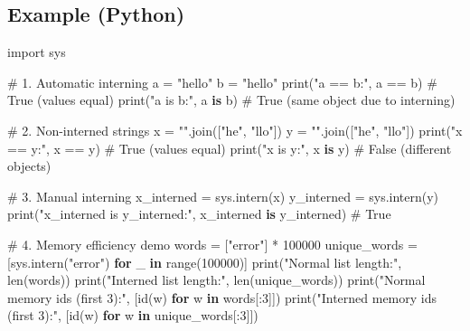 \documentclass[
  letterpaper,
  DIV=11,
  numbers=noendperiod]{scrreprt}
\newenvironment{Shaded}{\begin{snugshade}}{\end{snugshade}}
\newcommand{\BuiltInTok}[1]{\textcolor[rgb]{0.00,0.23,0.31}{#1}}
\newcommand{\CommentTok}[1]{\textcolor[rgb]{0.37,0.37,0.37}{#1}}
\newcommand{\ControlFlowTok}[1]{\textcolor[rgb]{0.00,0.23,0.31}{\textbf{#1}}}
\newcommand{\DecValTok}[1]{\textcolor[rgb]{0.68,0.00,0.00}{#1}}
\newcommand{\ImportTok}[1]{\textcolor[rgb]{0.00,0.46,0.62}{#1}}
\newcommand{\KeywordTok}[1]{\textcolor[rgb]{0.00,0.23,0.31}{\textbf{#1}}}
\newcommand{\NormalTok}[1]{\textcolor[rgb]{0.00,0.23,0.31}{#1}}
\newcommand{\OperatorTok}[1]{\textcolor[rgb]{0.37,0.37,0.37}{#1}}
\newcommand{\StringTok}[1]{\textcolor[rgb]{0.13,0.47,0.30}{#1}}
\begin{document}
\subsection{Example (Python)}\label{example-python-1}

\begin{Shaded}
\begin{Highlighting}[]
\ImportTok{import}\NormalTok{ sys}

\CommentTok{\# 1. Automatic interning}
\NormalTok{a }\OperatorTok{=} \StringTok{"hello"}
\NormalTok{b }\OperatorTok{=} \StringTok{"hello"}
\BuiltInTok{print}\NormalTok{(}\StringTok{"a == b:"}\NormalTok{, a }\OperatorTok{==}\NormalTok{ b)   }\CommentTok{\# True (values equal)}
\BuiltInTok{print}\NormalTok{(}\StringTok{"a is b:"}\NormalTok{, a }\KeywordTok{is}\NormalTok{ b)   }\CommentTok{\# True (same object due to interning)}

\CommentTok{\# 2. Non{-}interned strings}
\NormalTok{x }\OperatorTok{=} \StringTok{""}\NormalTok{.join([}\StringTok{"he"}\NormalTok{, }\StringTok{"llo"}\NormalTok{])}
\NormalTok{y }\OperatorTok{=} \StringTok{""}\NormalTok{.join([}\StringTok{"he"}\NormalTok{, }\StringTok{"llo"}\NormalTok{])}
\BuiltInTok{print}\NormalTok{(}\StringTok{"x == y:"}\NormalTok{, x }\OperatorTok{==}\NormalTok{ y)   }\CommentTok{\# True (values equal)}
\BuiltInTok{print}\NormalTok{(}\StringTok{"x is y:"}\NormalTok{, x }\KeywordTok{is}\NormalTok{ y)   }\CommentTok{\# False (different objects)}

\CommentTok{\# 3. Manual interning}
\NormalTok{x\_interned }\OperatorTok{=}\NormalTok{ sys.}\BuiltInTok{intern}\NormalTok{(x)}
\NormalTok{y\_interned }\OperatorTok{=}\NormalTok{ sys.}\BuiltInTok{intern}\NormalTok{(y)}
\BuiltInTok{print}\NormalTok{(}\StringTok{"x\_interned is y\_interned:"}\NormalTok{, x\_interned }\KeywordTok{is}\NormalTok{ y\_interned)  }\CommentTok{\# True}

\CommentTok{\# 4. Memory efficiency demo}
\NormalTok{words }\OperatorTok{=}\NormalTok{ [}\StringTok{"error"}\NormalTok{] }\OperatorTok{*} \DecValTok{100000}
\NormalTok{unique\_words }\OperatorTok{=}\NormalTok{ [sys.}\BuiltInTok{intern}\NormalTok{(}\StringTok{"error"}\NormalTok{) }\ControlFlowTok{for}\NormalTok{ \_ }\KeywordTok{in} \BuiltInTok{range}\NormalTok{(}\DecValTok{100000}\NormalTok{)]}
\BuiltInTok{print}\NormalTok{(}\StringTok{"Normal list length:"}\NormalTok{, }\BuiltInTok{len}\NormalTok{(words))}
\BuiltInTok{print}\NormalTok{(}\StringTok{"Interned list length:"}\NormalTok{, }\BuiltInTok{len}\NormalTok{(unique\_words))}
\BuiltInTok{print}\NormalTok{(}\StringTok{"Normal memory ids (first 3):"}\NormalTok{, [}\BuiltInTok{id}\NormalTok{(w) }\ControlFlowTok{for}\NormalTok{ w }\KeywordTok{in}\NormalTok{ words[:}\DecValTok{3}\NormalTok{]])}
\BuiltInTok{print}\NormalTok{(}\StringTok{"Interned memory ids (first 3):"}\NormalTok{, [}\BuiltInTok{id}\NormalTok{(w) }\ControlFlowTok{for}\NormalTok{ w }\KeywordTok{in}\NormalTok{ unique\_words[:}\DecValTok{3}\NormalTok{]])}
\end{Highlighting}
\end{Shaded}
\end{document}
